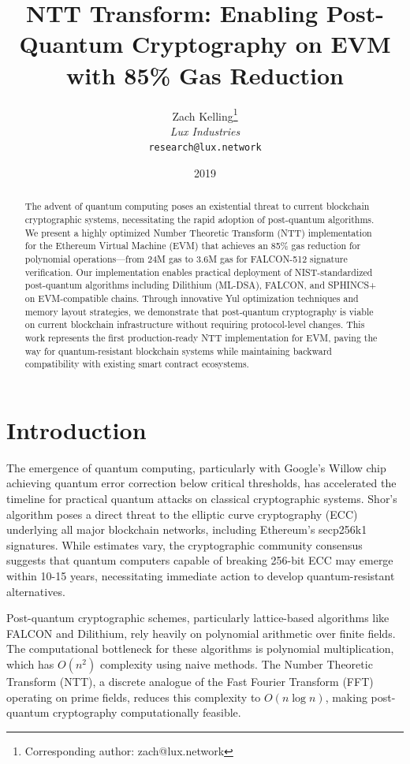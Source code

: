 \documentclass[11pt,a4paper]{article}
\title{NTT Transform: Enabling Post-Quantum Cryptography on EVM\\with 85\% Gas Reduction}
\author{
Zach Kelling\thanks{Corresponding author: zach@lux.network}\\
\textit{Lux Industries}\\
\texttt{research@lux.network}
}
\date{2019}
\begin{document}
\luxcoverpage
\maketitle

\begin{abstract}
The advent of quantum computing poses an existential threat to current blockchain cryptographic systems, necessitating the rapid adoption of post-quantum algorithms. We present a highly optimized Number Theoretic Transform (NTT) implementation for the Ethereum Virtual Machine (EVM) that achieves an 85\% gas reduction for polynomial operations—from 24M gas to 3.6M gas for FALCON-512 signature verification. Our implementation enables practical deployment of NIST-standardized post-quantum algorithms including Dilithium (ML-DSA), FALCON, and SPHINCS+ on EVM-compatible chains. Through innovative Yul optimization techniques and memory layout strategies, we demonstrate that post-quantum cryptography is viable on current blockchain infrastructure without requiring protocol-level changes. This work represents the first production-ready NTT implementation for EVM, paving the way for quantum-resistant blockchain systems while maintaining backward compatibility with existing smart contract ecosystems.
\end{abstract}

\section{Introduction}

The emergence of quantum computing, particularly with Google's Willow chip achieving quantum error correction below critical thresholds, has accelerated the timeline for practical quantum attacks on classical cryptographic systems. Shor's algorithm poses a direct threat to the elliptic curve cryptography (ECC) underlying all major blockchain networks, including Ethereum's secp256k1 signatures. While estimates vary, the cryptographic community consensus suggests that quantum computers capable of breaking 256-bit ECC may emerge within 10-15 years, necessitating immediate action to develop quantum-resistant alternatives.

Post-quantum cryptographic schemes, particularly lattice-based algorithms like FALCON and Dilithium, rely heavily on polynomial arithmetic over finite fields. The computational bottleneck for these algorithms is polynomial multiplication, which has $O(n^2)$ complexity using naive methods. The Number Theoretic Transform (NTT), a discrete analogue of the Fast Fourier Transform (FFT) operating on prime fields, reduces this complexity to $O(n \log n)$, making post-quantum cryptography computationally feasible.
\end{document}
